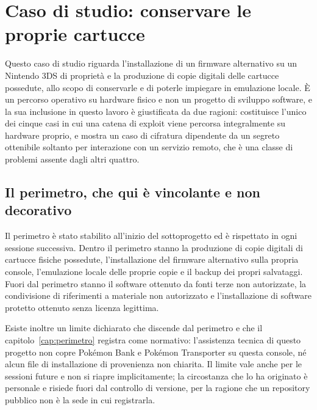 
\chapter{Caso di studio: conservare le proprie cartucce}
\label{cap:3ds}

Questo caso di studio riguarda l'installazione di un firmware alternativo su un Nintendo 3DS di proprietà e la produzione di copie digitali delle cartucce possedute, allo scopo di conservarle e di poterle impiegare in emulazione locale. È un percorso operativo su hardware fisico e non un progetto di sviluppo software, e la sua inclusione in questo lavoro è giustificata da due ragioni: costituisce l'unico dei cinque casi in cui una catena di exploit viene percorsa integralmente su hardware proprio, e mostra un caso di cifratura dipendente da un segreto ottenibile soltanto per interazione con un servizio remoto, che è una classe di problemi assente dagli altri quattro.

\section{Il perimetro, che qui è vincolante e non decorativo}

Il perimetro è stato stabilito all'inizio del sottoprogetto ed è rispettato in ogni sessione successiva. Dentro il perimetro stanno la produzione di copie digitali di cartucce fisiche possedute, l'installazione del firmware alternativo sulla propria console, l'emulazione locale delle proprie copie e il backup dei propri salvataggi. Fuori dal perimetro stanno il software ottenuto da fonti terze non autorizzate, la condivisione di riferimenti a materiale non autorizzato e l'installazione di software protetto ottenuto senza licenza legittima.

Esiste inoltre un limite dichiarato che discende dal perimetro e che il capitolo~\ref{cap:perimetro} registra come normativo: l'assistenza tecnica di questo progetto non copre Pokémon Bank e Pokémon Transporter su questa console, né alcun file di installazione di provenienza non chiarita. Il limite vale anche per le sessioni future e non si riapre implicitamente; la circostanza che lo ha originato è personale e risiede fuori dal controllo di versione, per la ragione che un repository pubblico non è la sede in cui registrarla.

